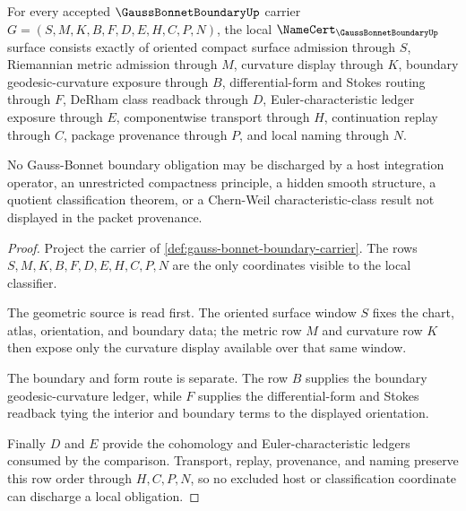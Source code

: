 \begin{theorem}
\label{thm:gauss-bonnet-boundary-namecert-obligations}
For every accepted $\GaussBonnetBoundaryUp$ carrier $G=(S,M,K,B,F,D,E,H,C,P,N)$, the local $\NameCert_{\GaussBonnetBoundaryUp}$ surface consists exactly of oriented compact surface admission through $S$, Riemannian metric admission through $M$, curvature display through $K$, boundary geodesic-curvature exposure through $B$, differential-form and Stokes routing through $F$, DeRham class readback through $D$, Euler-characteristic ledger exposure through $E$, componentwise transport through $H$, continuation replay through $C$, package provenance through $P$, and local naming through $N$.

No Gauss-Bonnet boundary obligation may be discharged by a host integration operator, an unrestricted compactness principle, a hidden smooth structure, a quotient classification theorem, or a Chern-Weil characteristic-class result not displayed in the packet provenance.
\end{theorem}
\begin{proof}
Project the carrier of \autoref{def:gauss-bonnet-boundary-carrier}. The rows $S,M,K,B,F,D,E,H,C,P,N$ are the only coordinates visible to the local classifier.

The geometric source is read first. The oriented surface window $S$ fixes the chart, atlas, orientation, and boundary data; the metric row $M$ and curvature row $K$ then expose only the curvature display available over that same window.

The boundary and form route is separate. The row $B$ supplies the boundary geodesic-curvature ledger, while $F$ supplies the differential-form and Stokes readback tying the interior and boundary terms to the displayed orientation.

Finally $D$ and $E$ provide the cohomology and Euler-characteristic ledgers consumed by the comparison. Transport, replay, provenance, and naming preserve this row order through $H,C,P,N$, so no excluded host or classification coordinate can discharge a local obligation.
\end{proof}

